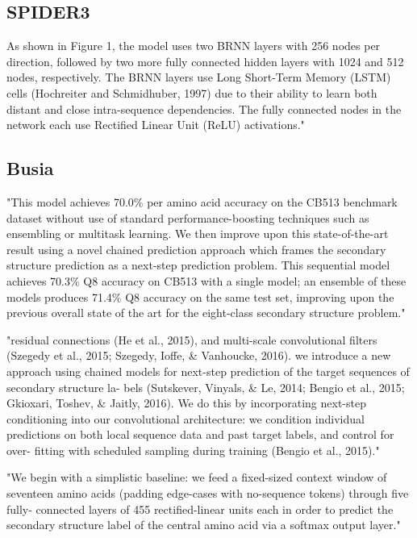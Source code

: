 \documentclass[]{scrartcl}
\begin{document}
\subsection{SPIDER3}
As shown in Figure 1, the model uses two BRNN layers with 256 nodes per direction, followed by two more fully connected hidden layers with 1024 and 512 nodes, respectively. The BRNN layers use Long Short-Term Memory (LSTM) cells (Hochreiter and Schmidhuber, 1997) due to their ability to learn both distant and close intra-sequence dependencies. The fully connected nodes in the network each use Rectified Linear Unit (ReLU) activations." \cite{Heffernan2017}

\subsection{Busia}
"This model achieves 70.0\% per amino acid accuracy on the CB513 benchmark dataset without use of standard performance-boosting techniques such as ensembling or multitask learning. We then improve upon this state-of-the-art result using a novel chained prediction approach which frames the secondary structure prediction as a next-step prediction problem. This sequential model achieves 70.3\% Q8 accuracy on CB513 with a single model; an ensemble of these models produces 71.4\% Q8 accuracy on the same test set, improving upon the previous overall state of the art for the eight-class secondary structure problem." \cite{Busia2017}

"residual connections (He et al., 2015), and multi-scale convolutional filters (Szegedy et al., 2015; Szegedy, Ioffe, \& Vanhoucke, 2016). we introduce a new approach using chained models for next-step prediction of the target sequences of secondary structure la- bels (Sutskever, Vinyals, \& Le, 2014; Bengio et al., 2015; Gkioxari, Toshev, \& Jaitly, 2016). We do this by incorporating next-step conditioning into our convolutional architecture: we condition individual predictions on both local sequence data and past target labels, and control for over- fitting with scheduled sampling during training (Bengio et al., 2015)." \cite{Busia2017}

"We begin with a simplistic baseline: we feed a fixed-sized context window of seventeen amino acids (padding edge-cases with no-sequence tokens) through five fully- connected layers of 455 rectified-linear units each in order to predict the secondary structure label of the central amino acid via a softmax output layer." \cite{Busia2017}
\end{document}
